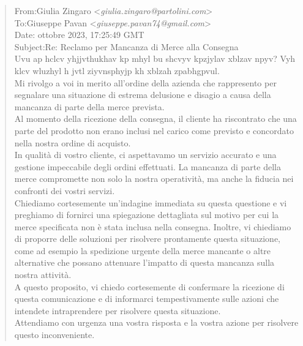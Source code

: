 \footnotesize
\begin{tcolorbox}[colback=gray!20, colframe=gray!50,sharp corners=southwest]
\begin{quote}
From:\qquad Giulia Zingaro <\textit{giulia.zingaro@partolini.com}>\\
To:\qquad Giuseppe Pavan <\textit{giuseppe.pavan74@gmail.com}>\\
Date: ottobre 2023, 17:25:49 GMT\\
Subject:\qquad Re: Reclamo per Mancanza di Merce alla Consegna\vspace{14pt}\\
Uvu ap hclcv yhjjvthukhav kp mhyl bu shcvyv kpzjylav xblzav npyv? Vyh klcv wluzhyl h jvtl ziyvnsphyjp kh xblzah zpabhgpvul.\vspace{14pt}\\
Mi rivolgo a voi in merito all'ordine della azienda che rappresento per segnalare una situazione di estrema delusione e disagio a causa della mancanza di parte della merce prevista.\vspace{14pt}\\
Al momento della ricezione della consegna, il cliente ha riscontrato che una parte del prodotto non erano inclusi nel carico come previsto e concordato nella nostra ordine di acquisto.\vspace{14pt}\\
In qualità di vostro cliente, ci aspettavamo un servizio accurato e una gestione impeccabile degli ordini effettuati. La mancanza di parte della merce compromette non solo la nostra operatività, ma anche la fiducia nei confronti dei vostri servizi.\vspace{14pt}\\
Chiediamo cortesemente un'indagine immediata su questa questione e vi preghiamo di fornirci una spiegazione dettagliata sul motivo per cui la merce specificata non è stata inclusa nella consegna. Inoltre, vi chiediamo di proporre delle soluzioni per risolvere prontamente questa situazione, come ad esempio la spedizione urgente della merce mancante o altre alternative che possano attenuare l'impatto di questa mancanza sulla nostra attività.\vspace{14pt}\\
A questo proposito, vi chiedo cortesemente di confermare la ricezione di questa comunicazione e di informarci tempestivamente sulle azioni che intendete intraprendere per risolvere questa situazione.\vspace{14pt}\\
Attendiamo con urgenza una vostra risposta e la vostra azione per risolvere questo inconveniente.
\end{quote}
\end{tcolorbox}
